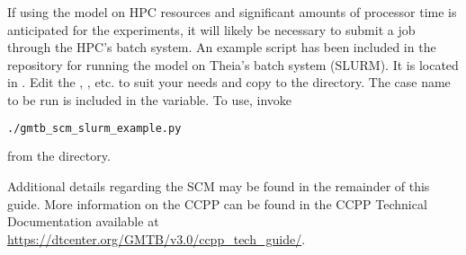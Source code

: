 If using the model on HPC resources and significant amounts of processor time is anticipated for the experiments, it will likely be necessary to submit a job through the HPC's batch system. An example script has been included in the repository for running the model on Theia's batch system (SLURM). It is located in . Edit the , , etc. to suit your needs and copy to the  directory. The case name to be run is included in the  variable. To use, invoke
\begin{lstlisting}[language=bash]
./gmtb_scm_slurm_example.py
\end{lstlisting}
from the  directory.

Additional details regarding the SCM may be found in the remainder of this guide. More information on the CCPP can be found in the CCPP Technical Documentation available at \url{https://dtcenter.org/GMTB/v3.0/ccpp\_tech\_guide/}.
